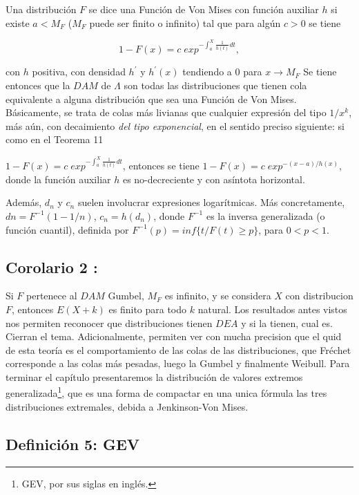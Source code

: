 \documentclass[
]{book}
\theoremstyle{definition}
\theoremstyle{definition}
\theoremstyle{definition}
\theoremstyle{definition}
\theoremstyle{remark}
\begin{document}
Una distribución \(F\) se dice una Función de Von Mises con función auxiliar \(h\) si existe \(a < M_F\) (\(M_F\) puede ser finito o infinito) tal que para algún \(c>0\) se tiene

\[
1-F(x)= c\;exp^{{- \int_a^X \frac{1}{h(t)} dt}},
\]

con \(h\) positiva, con
densidad \(h^\prime\) y \(h^\prime(x)\) tendiendo a \(0\) para \(x\rightarrow M_F\)
Se tiene entonces que la \(DAM\) de \(\Lambda\) son todas las distribuciones que tienen cola equivalente a alguna distribución que sea una Función de Von Mises. Básicamente, se trata de colas más livianas que cualquier expresión del tipo \(1/x^k\), más aún, con decaimiento \textit{del tipo exponencial}, en el sentido preciso siguiente: si como en el Teorema 11

\(1-F(x)= c\;exp^{{- \int_a^X \frac{1}{h(t)} dt}}\), entonces se tiene
\(1-F(x)= c\;exp^{-(x-a)/h(x)}\), donde la función auxiliar \(h\) es no-decreciente y con asíntota horizontal.

Además, \(d_n\) y \(c_n\) suelen involucrar expresiones logarítmicas. Más concretamente, \(dn = F^{-1}(1-1/n)\),
\(c_n = h(d_n)\), donde \(F^{-1}\) es la inversa generalizada (o función cuantil), definida por
\(F^{-1}(p)= inf\{t / F(t)\geq p\}\), para \(0<p<1\).

\subsection{Corolario 2 :}\label{corolario-2}

Si \(F\) pertenece al \(DAM\) Gumbel, \(M_F\) es infinito, y se considera \(X\) con distribucion \(F\), entonces \(E(X+k)\) es finito para todo \(k\) natural.
Los resultados antes vistos nos permiten reconocer que distribuciones tienen \(DEA\) y si la tienen, cual es. Cierran el tema. Adicionalmente, permiten ver con mucha precision que el quid de esta teoría es el comportamiento de las colas de las distribuciones, que Fréchet corresponde a las colas más pesadas, luego la Gumbel y finalmente Weibull.
Para terminar el capítulo presentaremos la distribución de valores extremos generalizada\footnote{GEV, por sus siglas en inglés.}, que es una forma de compactar en una unica fórmula las tres distribuciones extremales, debida a Jenkinson-Von Mises.

\subsection{Definición 5: GEV}\label{definiciuxf3n-5-gev}
\end{document}

